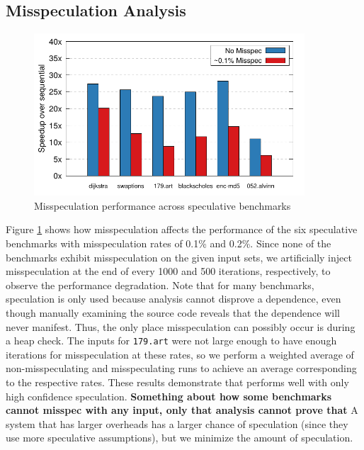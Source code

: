 \subsection{Misspeculation Analysis}
\begin{figure}[htp]
  \includegraphics[width=0.9\textwidth]{figures/misspec}
  \caption{Misspeculation performance across speculative benchmarks}
  \label{fig:misspec}
\end{figure}
Figure \ref{fig:misspec} shows how misspeculation affects the
performance of the six speculative benchmarks with misspeculation rates of
0.1\% and 0.2\%. Since none of the benchmarks exhibit misspeculation on the
given input sets, we artificially inject misspeculation at the end of
every 1000 and 500 iterations, respectively, to observe the performance
degradation.
Note that for many benchmarks, speculation is only used
because analysis cannot disprove a dependence, even though manually
examining the source code reveals that the dependence will never manifest.
Thus, the only place misspeculation can possibly occur is during a heap
check.
The inputs for \texttt{179.art} were not large enough to have
enough iterations for misspeculation at these rates, so we perform a
weighted average of non-misspeculating and misspeculating runs to achieve
an average corresponding to the respective rates.
These results demonstrate
that \name performs well with only high confidence speculation.
\textbf{Something about how some benchmarks cannot misspec
with any input, only that analysis cannot prove that} A system that has
larger overheads has a larger chance of speculation (since they use more
speculative assumptions), but we minimize the amount of speculation.



